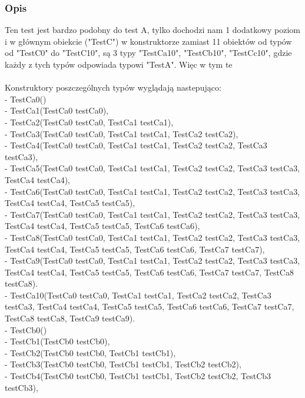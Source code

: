 \documentclass[12pt]{article}
\begin{document}
\subsubsection{Opis}
Ten test jest bardzo podobny do test A, tylko dochodzi nam 1 dodatkowy poziom i w głównym obiekcie ("TestC") w konstruktorze zamiast 11 obiektów od typów od "TestC0" do "TestC10", są 3 typy "TestCa10", "TestCb10", "TestCc10", gdzie każdy z tych typów odpowiada typowi "TestA". Więc w tym te\\
\\
Konstruktory poszczególnych typów wyglądają nastepująco:\\
- TestCa0()\\
- TestCa1(TestCa0 testCa0),\\
- TestCa2(TestCa0 testCa0, TestCa1 testCa1),\\
- TestCa3(TestCa0 testCa0, TestCa1 testCa1, TestCa2 testCa2),\\
- TestCa4(TestCa0 testCa0, TestCa1 testCa1, TestCa2 testCa2, TestCa3 testCa3),\\
- TestCa5(TestCa0 testCa0, TestCa1 testCa1, TestCa2 testCa2, TestCa3 testCa3, TestCa4 testCa4),\\
- TestCa6(TestCa0 testCa0, TestCa1 testCa1, TestCa2 testCa2, TestCa3 testCa3, TestCa4 testCa4, TestCa5 testCa5),\\
- TestCa7(TestCa0 testCa0, TestCa1 testCa1, TestCa2 testCa2, TestCa3 testCa3, TestCa4 testCa4, TestCa5 testCa5, TestCa6 testCa6),\\
- TestCa8(TestCa0 testCa0, TestCa1 testCa1, TestCa2 testCa2, TestCa3 testCa3, TestCa4 testCa4, TestCa5 testCa5, TestCa6 testCa6, TestCa7 testCa7),\\
- TestCa9(TestCa0 testCa0, TestCa1 testCa1, TestCa2 testCa2, TestCa3 testCa3, TestCa4 testCa4, TestCa5 testCa5, TestCa6 testCa6, TestCa7 testCa7, TestCa8 testCa8).\\
- TestCa10(TestCa0 testCa0, TestCa1 testCa1, TestCa2 testCa2, TestCa3 testCa3, TestCa4 testCa4, TestCa5 testCa5, TestCa6 testCa6, TestCa7 testCa7, TestCa8 testCa8, TestCa9 testCa9).\\
- TestCb0()\\
- TestCb1(TestCb0 testCb0),\\
- TestCb2(TestCb0 testCb0, TestCb1 testCb1),\\
- TestCb3(TestCb0 testCb0, TestCb1 testCb1, TestCb2 testCb2),\\
- TestCb4(TestCb0 testCb0, TestCb1 testCb1, TestCb2 testCb2, TestCb3 testCb3),\\
\end{document}
